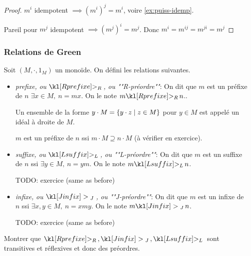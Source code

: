 \begin{proof}
	$m^i$ idempotent $\implies (m^i)^j = m^i$, voire \ref{ex:puiss-idemp}.

	Pareil pour $m^j$ idempotent $\implies (m^j)^i = m^j$.
	Donc $m^i = m^{ij} = m^{ji} = m^{j}$
\end{proof}

\subsubsection{Relations de Green}

\begin{definition}
	Soit $(M,\cdot , 1_M)$ un monoïde. On défini les relations suivantes.

	\begin{itemize}
		\item \emph{prefixe, ou $\geqr$, ou ""R-préordre""}: On dit que $m$ est un préfixe de $n$ \ssi $\exists x \in M, \ n = mx$.
		      On le note $m \geqr n$..

		      Un ensemble de la forme $y \cdot M = \left\{y \cdot z \mid z \in M\right\}$ pour $y \in M$ est appelé un idéal à droite de $M$.

		      $m$ est un préfixe de $n$ ssi $m \cdot M \supseteq n \cdot M$ (à vérifier en exercice).


		\item \emph{suffixe, ou $\geql$, ou ""L-préordre""}: On dit que $m$ est un suffixe de $n$ ssi $\exists y \in M, \ n = ym$.
		      On le note $m \geql n$.

		      TODO: exercice (same as before)


		\item \emph{infixe, ou $\geqj$, ou ""J-préordre""}: On dit que $m$ est un infixe de $n$ ssi $\exists x,y \in M, \ n = xmy$.
		      On le note $m \geqj n$.

		      TODO: exercice (same as before)
	\end{itemize}
\end{definition}

\begin{exercice}
	Montrer que $\geqr,\geqj,\geql$  sont transitives et réflexives et donc des préordres.
\end{exercice}

